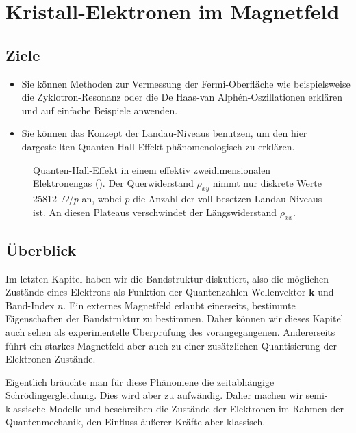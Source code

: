 \renewcommand{\chapterauthors}{Markus Lippitz}
\renewcommand{\lastmod}{22. Mai 2023} 

\chapter{Kristall-Elektronen im Magnetfeld}




\section{Ziele}
 
\begin{itemize}
\item Sie können  Methoden zur Vermessung der Fermi-Oberfläche wie beispielsweise die Zyklotron-Resonanz oder die De Haas-van Alphén-Oszillationen erklären und auf einfache Beispiele anwenden.
\item Sie können das Konzept der Landau-Niveaus benutzen, um den hier dargestellten Quanten-Hall-Effekt phänomenologisch zu erklären.
\end{itemize}


\begin{figure}
    \caption{Quanten-Hall-Effekt in einem effektiv zweidimensionalen Elektronengas (\cite{Klitzing1984}). Der Querwiderstand $\rho_{xy}$ nimmt nur diskrete Werte 25812~$\Omega / p$ an, wobei $p$ die Anzahl der voll besetzen Landau-Niveaus ist. An diesen Plateaus verschwindet der Längswiderstand $\rho_{xx}$.}
    \label{fig:4_qhe_gaas}
\end{figure}
 

\section{Überblick}

Im letzten Kapitel haben wir die Bandstruktur diskutiert, also die möglichen Zustände eines Elektrons als Funktion der Quantenzahlen Wellenvektor $\mathbf{k}$ und Band-Index $n$. Ein externes Magnetfeld erlaubt einerseits, bestimmte  Eigenschaften der Bandstruktur zu bestimmen. Daher können wir dieses Kapitel auch sehen als experimentelle Überprüfung des vorangegangenen. Andererseits führt ein starkes Magnetfeld aber auch zu einer zusätzlichen Quantisierung der Elektronen-Zustände.

Eigentlich bräuchte man für diese Phänomene die zeitabhängige Schrödingergleichung. Dies wird aber zu aufwändig. Daher machen wir semi-klassische Modelle und beschreiben die Zustände der Elektronen im Rahmen der Quantenmechanik, den Einfluss äußerer Kräfte aber klassisch.

